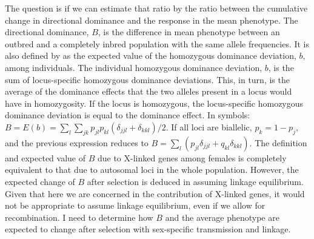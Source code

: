 \documentclass[a4paper,12pt]{article}
\begin{document}
The question is if we can estimate that ratio by the ratio between the cumulative change in directional dominance and the response in the mean phenotype. The directional dominance, $B$, is the difference in mean phenotype between an outbred and a completely inbred population with the same allele frequencies. It is also defined by \citet{Kelly1999b} as the expected value of the homozygous dominance deviation, $b$, among individuals. The individual homozygous dominance deviation, $b$, is the sum of locus-specific homozygous dominance deviations. This, in turn, is the average of the dominance effects that the two alleles present in a locus would have in homozygosity. If the locus is homozygous, the locus-specific homozygous dominance deviation is equal to the dominance effect. In symbols: $B = E(b) = \sum_l \sum_{jk} p_{jl}p_{kl}(\delta _{jjl}+\delta _{kkl})/2$. If all loci are biallelic, $p_k = 1-p_j$, and the previous expression reduces to $B=\sum_l (p_{jl}\delta _{jjl} + q_{kl}\delta _{kkl})$. %
The definition and expected value of $B$ due to X-linked genes among females is completely equivalent to that due to autosomal loci in the whole population. However, the expected change of $B$ after selection is deduced in \citet{Kelly1999b} assuming linkage equilibrium. Given that here we are concerned in the contribution of X-linked genes, it would not be appropriate to assume linkage equilibrium, even if we allow for recombination. I need to determine how $B$ and the average phenotype are expected to change after selection with sex-specific transmission and linkage.



\end{document}

